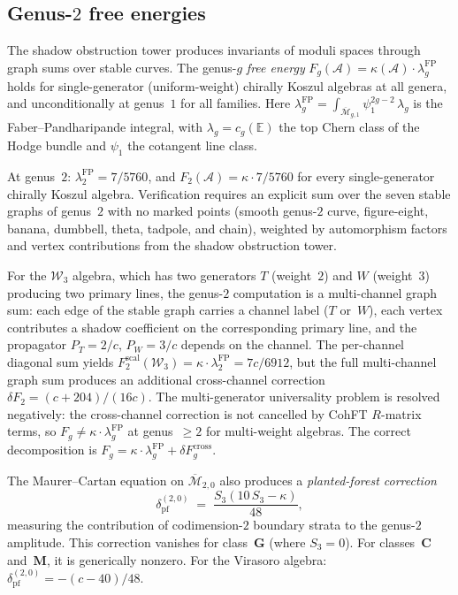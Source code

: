 \documentclass[11pt,reqno]{amsart}
\theoremstyle{definition}
\theoremstyle{remark}
\newcommand{\cA}{\mathcal{A}}
\newcommand{\cM}{\mathcal{M}}
\numberwithin{equation}{section}
\begin{document}
\subsection{Genus-$2$ free energies}

The shadow obstruction tower produces invariants of moduli spaces
through graph sums over stable curves. The genus-$g$ \emph{free energy}
$F_g(\cA) = \kappa(\cA) \cdot \lambda_g^{\mathrm{FP}}$
holds for single-generator (uniform-weight) chirally
Koszul algebras at all genera, and unconditionally at genus~$1$
for all families. Here
$\lambda_g^{\mathrm{FP}} =
 \int_{\overline{\cM}_{g,1}} \psi_1^{2g-2}\,\lambda_g$
is the Faber--Pandharipande integral, with
$\lambda_g = c_g(\mathbb{E})$ the top Chern class
of the Hodge bundle and $\psi_1$ the cotangent line class.

At genus~$2$: $\lambda_2^{\mathrm{FP}} = 7/5760$, and
$F_2(\cA) = \kappa \cdot 7/5760$ for every single-generator
chirally Koszul algebra. Verification requires
an explicit sum over the seven stable graphs of
genus~$2$ with no marked points (smooth genus-$2$
curve, figure-eight, banana, dumbbell, theta,
tadpole, and chain), weighted by automorphism factors
and vertex contributions from the shadow obstruction tower.

For the $\mathcal{W}_3$ algebra, which has two generators
$T$ (weight~$2$) and $W$ (weight~$3$) producing two primary
lines, the genus-$2$ computation is a multi-channel graph sum:
each edge of the stable graph carries a channel label
($T$ or~$W$), each vertex contributes a shadow coefficient on
the corresponding primary line, and the propagator
$P_T = 2/c$, $P_W = 3/c$ depends on the channel. The
per-channel diagonal sum yields
$F_2^{\mathrm{scal}}(\mathcal{W}_3) = \kappa \cdot \lambda_2^{\mathrm{FP}}
= 7c/6912$, but the full multi-channel graph sum produces an
additional cross-channel correction
$\delta F_2 = (c+204)/(16c)$. The multi-generator universality problem is resolved negatively:
the cross-channel correction is not cancelled by CohFT $R$-matrix
terms, so $F_g \neq \kappa \cdot \lambda_g^{\mathrm{FP}}$ at
genus~$\geq 2$ for multi-weight algebras. The correct
decomposition is $F_g = \kappa \cdot \lambda_g^{\mathrm{FP}} +
\delta F_g^{\mathrm{cross}}$.

The Maurer--Cartan equation on
$\overline{\cM}_{2,0}$ also produces a
\emph{planted-forest correction}
\begin{equation}\label{eq:intro-planted-forest}
 \delta_{\mathrm{pf}}^{(2,0)}
 \;=\;
 \frac{S_3(10\,S_3 - \kappa)}{48},
\end{equation}
measuring the contribution of codimension-$2$ boundary strata
to the genus-$2$ amplitude. This correction vanishes for
class~$\mathbf{G}$ (where $S_3 = 0$). For
classes~$\mathbf{C}$ and~$\mathbf{M}$, it is generically nonzero.
For the Virasoro algebra:
$\delta_{\mathrm{pf}}^{(2,0)} = -(c - 40)/48$.
\end{document}

